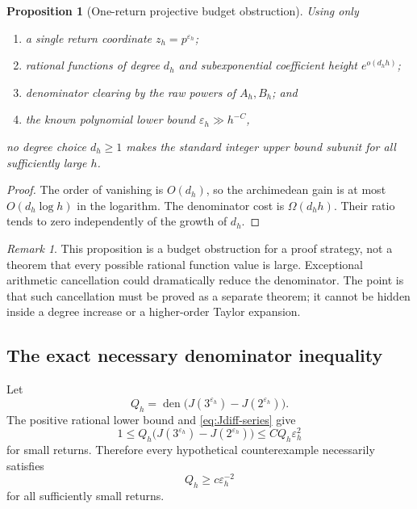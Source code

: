 \documentclass[11pt]{article}
\newtheorem{proposition}[theorem]{Proposition}
\theoremstyle{definition}
\theoremstyle{remark}
\newtheorem{remark}[theorem]{Remark}
\newcommand{\den}{\operatorname{den}}
\newcommand{\eps}{\varepsilon}
\begin{document}
\begin{proposition}[One-return projective budget obstruction]\label{prop:one-return-barrier}
Using only
\begin{enumerate}
\item a single return coordinate $z_h=p^{\eps_h}$;
\item rational functions of degree $d_h$ and subexponential coefficient height $e^{o(d_hh)}$;
\item denominator clearing by the raw powers of $A_h,B_h$; and
\item the known polynomial lower bound $\eps_h\gg h^{-C}$,
\end{enumerate}
no degree choice $d_h\ge1$ makes the standard integer upper bound subunit for all sufficiently large $h$.
\end{proposition}

\begin{proof}
The order of vanishing is $O(d_h)$, so the archimedean gain is at most $O(d_h\log h)$ in the logarithm.  The denominator cost is $\Omega(d_hh)$.  Their ratio tends to zero independently of the growth of $d_h$.
\end{proof}

\begin{remark}
This proposition is a budget obstruction for a proof strategy, not a theorem that every possible rational function value is large.  Exceptional arithmetic cancellation could dramatically reduce the denominator.  The point is that such cancellation must be proved as a separate theorem; it cannot be hidden inside a degree increase or a higher-order Taylor expansion.
\end{remark}

\subsection{The exact necessary denominator inequality}

Let
\begin{equation}\label{eq:Qh}
 Q_h=\den\bigl(J(3^{\eps_h})-J(2^{\eps_h})\bigr).
\end{equation}
The positive rational lower bound and \eqref{eq:Jdiff-series} give
\begin{equation}\label{eq:Qnecessary}
 1\le Q_h\bigl(J(3^{\eps_h})-J(2^{\eps_h})\bigr)
 \le C Q_h\eps_h^2
\end{equation}
for small returns.  Therefore every hypothetical counterexample necessarily satisfies
\begin{equation}\label{eq:Qlower}
 Q_h\ge c\eps_h^{-2}
\end{equation}
for all sufficiently small returns.
\end{document}
